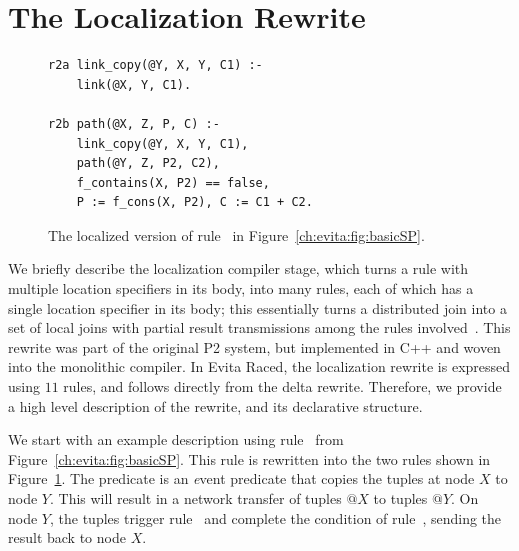 \section{The Localization Rewrite}
\label{ch:evita:sec:local}

\begin{figure}[!t]
\ssp
\centering
\begin{lstlisting}
r2a link_copy(@Y, X, Y, C1) :-
    link(@X, Y, C1).

r2b path(@X, Z, P, C) :-
    link_copy(@Y, X, Y, C1), 
    path(@Y, Z, P2, C2),
    f_contains(X, P2) == false,
    P := f_cons(X, P2), C := C1 + C2.
\end{lstlisting}
\caption{\label{ch:evita:fig:basicSPLocal}The localized version of rule~ in
Figure~\ref{ch:evita:fig:basicSP}.}
\end{figure}

We briefly describe the localization compiler stage, which turns a rule with
multiple location specifiers in its body, into many rules, each of which has a
single location specifier in its body; this essentially turns a distributed
join into a set of local joins with partial result transmissions among the
rules involved~\cite{loo-sigmod06}.  This rewrite was part of the original P2
system, but implemented in C++ and woven into the monolithic compiler.  In
Evita Raced, the localization rewrite is expressed using $11$ rules, and
follows directly from the delta rewrite. Therefore, we provide a high level
description of the rewrite, and its declarative structure.

We start with an example description using rule~ from
Figure~\ref{ch:evita:fig:basicSP}.  This rule is rewritten into the two rules
shown in Figure~\ref{ch:evita:fig:basicSPLocal}.  The  predicate
is an {\emph event} predicate that copies the  tuples at node $X$ to
node $Y$.  This will result in a network transfer of  tuples $@X$ to
 tuples $@Y$.  On node $Y$, the  tuples trigger
rule~ and complete the condition of rule~, sending the result
back to node $X$.


